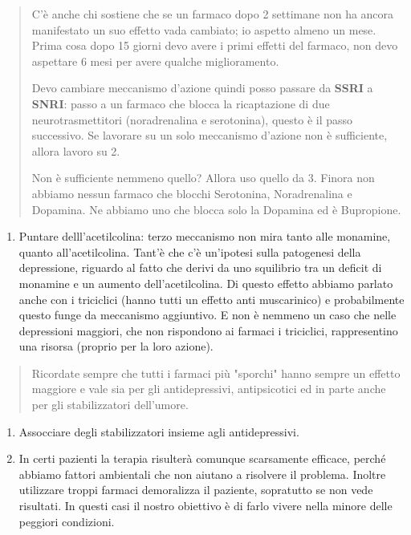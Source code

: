 \documentclass[]{article}
\begin{document}
\begin{quote}
C'è anche chi sostiene che se un farmaco dopo 2 settimane non ha ancora
manifestato un suo effetto vada cambiato; io aspetto almeno un mese.
Prima cosa dopo 15 giorni devo avere i primi effetti del farmaco, non
devo aspettare 6 mesi per avere qualche miglioramento.

Devo cambiare meccanismo d'azione quindi posso passare da \textbf{SSRI}
a \textbf{SNRI}: passo a un farmaco che blocca la ricaptazione di due
neurotrasmettitori (noradrenalina e serotonina), questo è il passo
successivo. Se lavorare su un solo meccanismo d'azione non è
sufficiente, allora lavoro su 2.

Non è sufficiente nemmeno quello? Allora uso quello da 3. Finora non
abbiamo nessun farmaco che blocchi Serotonina, Noradrenalina e Dopamina.
Ne abbiamo uno che blocca solo la Dopamina ed è Bupropione.
\end{quote}

\begin{enumerate}
\def\labelenumi{\arabic{enumi}.}
\item
  Puntare delll'acetilcolina: terzo meccanismo non mira tanto alle
  monamine, quanto all'acetilcolina. Tant'è che c'è un'ipotesi sulla
  patogenesi della depressione, riguardo al fatto che derivi da uno
  squilibrio tra un deficit di monamine e un aumento dell'acetilcolina.
  Di questo effetto abbiamo parlato anche con i triciclici (hanno tutti
  un effetto anti muscarinico) e probabilmente questo funge da
  meccanismo aggiuntivo. E non è nemmeno un caso che nelle depressioni
  maggiori, che non rispondono ai farmaci i triciclici, rappresentino
  una risorsa (proprio per la loro azione).
\end{enumerate}

\begin{quote}
Ricordate sempre che tutti i farmaci più "sporchi" hanno sempre un
effetto maggiore e vale sia per gli antidepressivi, antipsicotici ed in
parte anche per gli stabilizzatori dell'umore.
\end{quote}

\begin{enumerate}
\def\labelenumi{\arabic{enumi}.}
\item
  Assocciare degli stabilizzatori insieme agli antidepressivi.
\item
  In certi pazienti la terapia risulterà comunque scarsamente efficace,
  perché abbiamo fattori ambientali che non aiutano a risolvere il
  problema. Inoltre utilizzare troppi farmaci demoralizza il paziente,
  sopratutto se non vede risultati. In questi casi il nostro obiettivo è
  di farlo vivere nella minore delle peggiori condizioni.
\end{enumerate}
\end{document}
